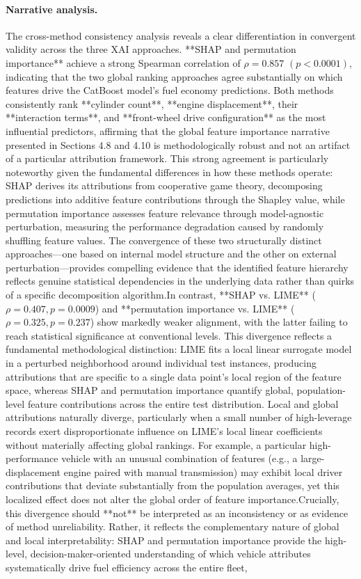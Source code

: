 \paragraph{Narrative analysis.}
The cross-method consistency analysis reveals a clear differentiation in convergent validity across the three XAI approaches. **SHAP and permutation importance** achieve a strong Spearman correlation of \(\rho = 0.857\) \((p < 0.0001)\), indicating that the two global ranking approaches agree substantially on which features drive the CatBoost model's fuel economy predictions. Both methods consistently rank **cylinder count**, **engine displacement**, their **interaction terms**, and **front-wheel drive configuration** as the most influential predictors, affirming that the global feature importance narrative presented in Sections 4.8 and 4.10 is methodologically robust and not an artifact of a particular attribution framework. This strong agreement is particularly noteworthy given the fundamental differences in how these methods operate: SHAP derives its attributions from cooperative game theory, decomposing predictions into additive feature contributions through the Shapley value, while permutation importance assesses feature relevance through model-agnostic perturbation, measuring the performance degradation caused by randomly shuffling feature values. The convergence of these two structurally distinct approaches—one based on internal model structure and the other on external perturbation—provides compelling evidence that the identified feature hierarchy reflects genuine statistical dependencies in the underlying data rather than quirks of a specific decomposition algorithm.In contrast, **SHAP vs. LIME** (\(\rho = 0.407, p = 0.0009\)) and **permutation importance vs. LIME** (\(\rho = 0.325, p = 0.237\)) show markedly weaker alignment, with the latter failing to reach statistical significance at conventional levels. This divergence reflects a fundamental methodological distinction: LIME fits a local linear surrogate model in a perturbed neighborhood around individual test instances, producing attributions that are specific to a single data point's local region of the feature space, whereas SHAP and permutation importance quantify global, population-level feature contributions across the entire test distribution. Local and global attributions naturally diverge, particularly when a small number of high-leverage records exert disproportionate influence on LIME's local linear coefficients without materially affecting global rankings. For example, a particular high-performance vehicle with an unusual combination of features (e.g., a large-displacement engine paired with manual transmission) may exhibit local driver contributions that deviate substantially from the population averages, yet this localized effect does not alter the global order of feature importance.Crucially, this divergence should **not** be interpreted as an inconsistency or as evidence of method unreliability. Rather, it reflects the complementary nature of global and local interpretability: SHAP and permutation importance provide the high-level, decision-maker-oriented understanding of which vehicle attributes systematically drive fuel efficiency across the entire fleet, 